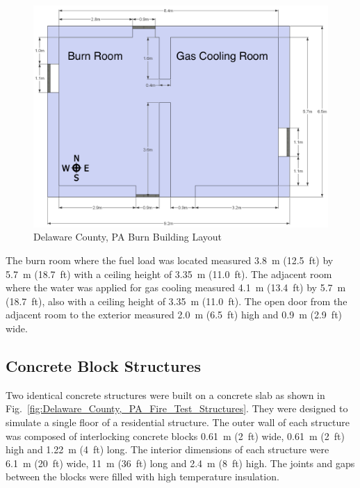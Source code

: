 \documentclass[12pt,oneside]{book}
\begin{document}

\begin{figure}[!ht]
	\includegraphics[width=6in]{../Figures/Pictures/DelCoBurnBuildingDimensions}
	\caption{Delaware County, PA Burn Building Layout}
	\label{fig:Delaware_County,_PA_Burn_Building_Layout}
\end{figure}

The burn room where the fuel load was located measured 3.8~m (12.5~ft) by 5.7~m (18.7~ft) with a ceiling height of 3.35~m (11.0~ft). The adjacent room where the water was applied for gas cooling measured 4.1~m (13.4~ft) by 5.7~m (18.7~ft), also with a ceiling height of 3.35~m (11.0~ft). The open door from the adjacent room to the exterior measured 2.0~m (6.5~ft) high and 0.9~m (2.9~ft) wide.

\subsection{Concrete Block Structures}
\label{sec:Experimental Structures}

Two identical concrete structures were built on a concrete slab as shown in Fig.~\ref{fig:Delaware_County,_PA_Fire_Test_Structures}. They were designed to simulate a single floor of a residential structure.  The outer wall of each structure was composed of interlocking concrete blocks 0.61~m (2~ft) wide, 0.61~m (2~ft) high and 1.22~m (4~ft) long.  The interior dimensions of each structure were 6.1~m (20~ft) wide, 11~m (36~ft) long and 2.4~m (8~ft) high. The joints and gaps between the blocks were filled with high temperature insulation.
\end{document}
